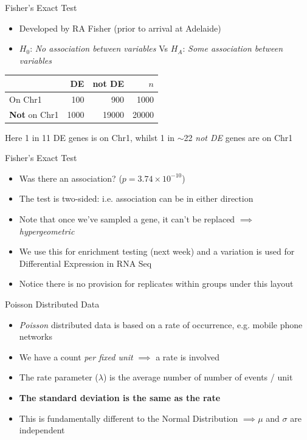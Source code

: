 \documentclass[aspectratio=169,11pt]{beamer}
\begin{document}
\begin{frame}{Fisher's Exact Test}

	\begin{itemize}
		\item Developed by RA Fisher (prior to arrival at Adelaide)
		\item $H_0$: \textit{No association between variables} Vs $H_A$: \textit{Some association between variables}
	\end{itemize}
	\pause
	\begin{center}
		\begin{tabular}{l|rr|r}
			& \textbf{DE} & \textbf{not DE} & $n$ \\
			\toprule
			On Chr1 & 100 & 900 & 1000\\
			\textbf{Not} on Chr1 & 1000 & 19000 & 20000 \\
			\bottomrule
		\end{tabular}	
	\end{center}
	
	Here 1 in 11 DE genes is on Chr1, whilst 1 in $\sim$22 \textit{not DE} genes are on Chr1

\end{frame}

\begin{frame}{Fisher's Exact Test}

	\begin{itemize}
		\item Was there an association? ($p = 3.74\times10^{-10}$)
		\item The test is two-sided: i.e. association can be in either direction
		\item Note that once we've sampled a gene, it can't be replaced $\implies$ \textit{hypergeometric}
		\pause
		\item We use this for enrichment testing (next week) and a variation is used for Differential Expression in RNA Seq
		\item Notice there is no provision for replicates within groups under this layout
	\end{itemize}

\end{frame}

\begin{frame}{Poisson Distributed Data}

	\begin{itemize}
		\item \textit{Poisson} distributed data is based on a rate of occurrence, e.g. mobile phone networks
		\item We have a count \textit{per fixed unit} $\implies$ a rate is involved
		\item The rate parameter ($\lambda$) is the average number of number of events / unit
		\item \textbf{The standard deviation is the same as the rate}
		\item This is fundamentally different to the Normal Distribution $\implies \mu$ and $\sigma$ are independent
	\end{itemize}
	
\end{frame}
\end{document}
